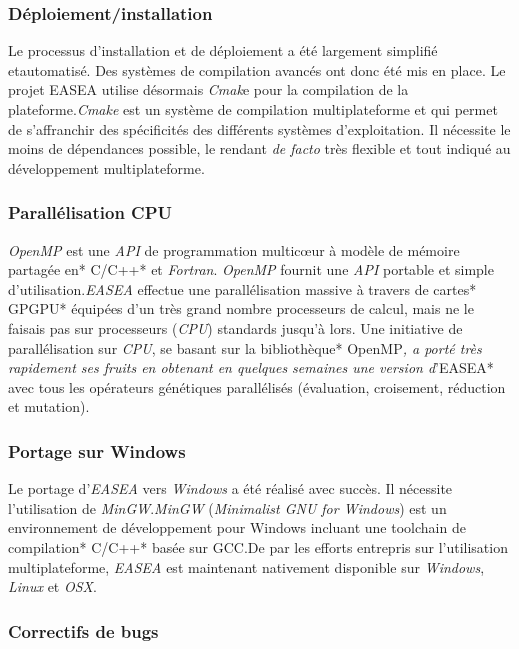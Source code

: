 \documentclass[french, 11pt]{memoir}
\begin{document}
\subsubsection{Déploiement/installation}\label{duxe9ploiementinstallation}

Le processus d'installation et de déploiement a été largement simplifié
etautomatisé. Des systèmes de compilation avancés ont donc été mis en
place. Le projet EASEA utilise désormais \emph{Cmak}e pour la
compilation de la plateforme.\emph{Cmake} est un système de compilation
multiplateforme et qui permet de s'affranchir des spécificités des
différents systèmes d'exploitation. Il nécessite le moins de dépendances
possible, le rendant \emph{de facto} très flexible et tout indiqué au
développement multiplateforme.

\subsubsection{Parallélisation CPU}\label{paralluxe9lisation-cpu}

\emph{OpenMP} est une \emph{API} de programmation multicœur à modèle de
mémoire partagée en* C/C++* et \emph{Fortran}. \emph{OpenMP} fournit une
\emph{API} portable et simple d'utilisation.\emph{EASEA} effectue une
parallélisation massive à travers de cartes* GPGPU* équipées d'un très
grand nombre processeurs de calcul, mais ne le faisais pas sur
processeurs (\emph{CPU}) standards jusqu'à lors. Une initiative de
parallélisation sur \emph{CPU}, se basant sur la bibliothèque*
OpenMP\emph{, a porté très rapidement ses fruits en obtenant en quelques
	semaines une version d}'EASEA* avec tous les opérateurs génétiques
parallélisés (évaluation, croisement, réduction et mutation).

\subsubsection{Portage sur Windows}\label{portage-sur-windows}

Le portage d'\emph{EASEA} vers \emph{Windows} a été réalisé avec succès.
Il nécessite l'utilisation de \emph{MinGW}.\emph{MinGW}
(\emph{Minimalist GNU for Windows}) est un environnement de
développement pour Windows incluant une toolchain de compilation* C/C++*
basée sur GCC.De par les efforts entrepris sur l'utilisation
multiplateforme, \emph{EASEA }est maintenant nativement disponible sur
\emph{Windows}, \emph{Linux} et \emph{OSX}.

\subsubsection{Correctifs de bugs}\label{correctifs-de-bugs}
\end{document}
